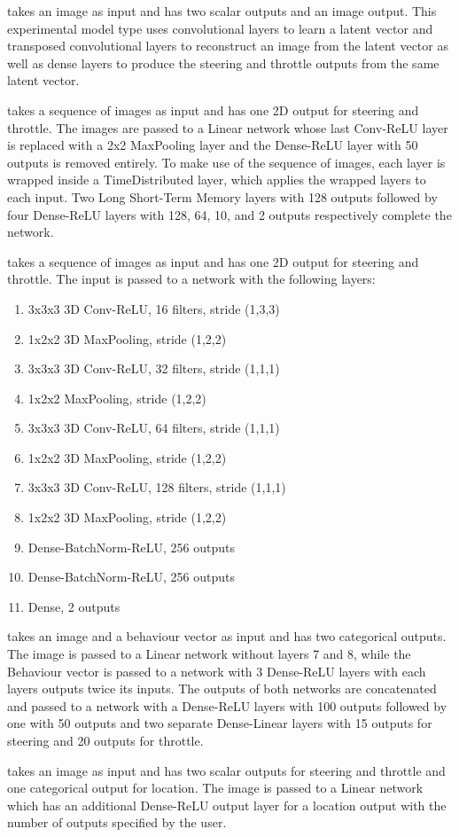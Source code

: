 \documentclass[conference]{IEEEtran}
\begin{document}
\begin{description}
\item[Latent] takes an image as input and has two scalar outputs and an image output. This experimental model type uses convolutional layers to learn a latent vector and transposed convolutional layers to reconstruct an image from the latent vector as well as dense layers to produce the steering and throttle outputs from the same latent vector.
\item[RNN] takes a sequence of images as input and has one 2D output for steering and throttle. The images are passed to a Linear network whose last Conv-ReLU layer is replaced with a 2x2 MaxPooling layer and the Dense-ReLU layer with 50 outputs is removed entirely. To make use of the sequence of images, each layer is wrapped inside a TimeDistributed layer, which applies the wrapped layers to each input. Two Long Short-Term Memory layers with 128 outputs followed by four Dense-ReLU layers with 128, 64, 10, and 2 outputs respectively complete the network.
\item[3D] takes a sequence of images as input and has one 2D output for steering and throttle. The input is passed to a network with the following layers:
\begin{enumerate}
\item
3x3x3 3D Conv-ReLU, 16 filters, stride (1,3,3)
\item
1x2x2 3D MaxPooling, stride (1,2,2)
\item
3x3x3 3D Conv-ReLU, 32 filters, stride (1,1,1)
\item
1x2x2 MaxPooling, stride (1,2,2)
\item
3x3x3 3D Conv-ReLU, 64 filters, stride (1,1,1)
\item
1x2x2 3D MaxPooling, stride (1,2,2)
\item
3x3x3 3D Conv-ReLU, 128 filters, stride (1,1,1)
\item
1x2x2 3D MaxPooling, stride (1,2,2)
\item
Dense-BatchNorm-ReLU, 256 outputs
\item
Dense-BatchNorm-ReLU, 256 outputs
\item
Dense, 2 outputs
\end{enumerate}
\item[Behaviour] takes an image and a behaviour vector as input and has two categorical outputs. The image is passed to a Linear network without layers 7 and 8, while the Behaviour vector is passed to a network with 3 Dense-ReLU layers with each layers outputs twice its inputs. The outputs of both networks are concatenated and passed to a network with a Dense-ReLU layers with 100 outputs followed by one with 50 outputs and two separate Dense-Linear layers with 15 outputs for steering and 20 outputs for throttle.
\item[Localizer] takes an image as input and has two scalar outputs for steering and throttle and one categorical output for location. The image is passed to a Linear network which has an additional Dense-ReLU output layer for a location output with the number of outputs specified by the user.
\end{description}
\end{document}

